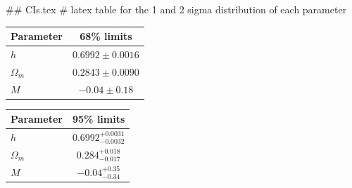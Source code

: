## CIs.tex
# latex table for the 1 and 2 sigma distribution of each parameter

\begin{tabular} { l  c}
 Parameter &  68\% limits\\
\hline
{\boldmath$h              $} & $0.6992\pm 0.0016          $\\
{\boldmath$\Omega_m       $} & $0.2843\pm 0.0090          $\\
{\boldmath$M              $} & $-0.04\pm 0.18             $\\
\hline
\end{tabular}

\begin{tabular} { l  c}
 Parameter &  95\% limits\\
\hline
{\boldmath$h              $} & $0.6992^{+0.0031}_{-0.0032}$\\
{\boldmath$\Omega_m       $} & $0.284^{+0.018}_{-0.017}   $\\
{\boldmath$M              $} & $-0.04^{+0.35}_{-0.34}     $\\
\hline
\end{tabular}
